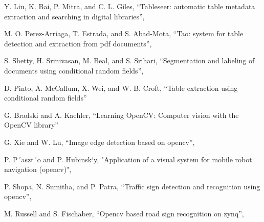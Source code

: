 \documentclass[uplatex, twocolumn,10pt]{jsarticle}
\begin{document}
\begin{thebibliography}{99}
    Y. Liu, K. Bai, P. Mitra, and C. L. Giles,
    \newblock “Tableseer: automatic table metadata extraction and searching in digital libraries”,
    
    M. O. Perez-Arriaga, T. Estrada, and S. Abad-Mota,
    \newblock “Tao: system for table detection and extraction from pdf documents”,

    S. Shetty, H. Srinivasan, M. Beal, and S. Srihari,
    \newblock “Segmentation and labeling of documents using conditional random fields”,

    D. Pinto, A. McCallum, X. Wei, and W. B. Croft,
    \newblock “Table extraction using conditional random fields”
    
    G. Bradski and A. Kaehler,
    \newblock “Learning OpenCV: Computer vision with the OpenCV library”

    G. Xie and W. Lu,
    \newblock “Image edge detection based on opencv”,

    P. P´aszt´o and P. Hubinsk`y,
    \newblock "Application of a visual system for mobile robot navigation (opencv)",
    
    P. Shopa, N. Sumitha, and P. Patra,
    \newblock “Traffic sign detection and recognition using opencv”,

    M. Russell and S. Fischaber,
    \newblock “Opencv based road sign recognition on zynq”,
    

\end{thebibliography}
\end{document}
